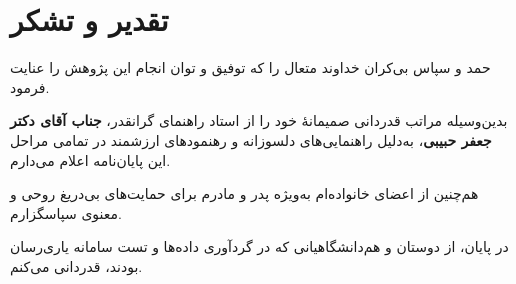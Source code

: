 
\section*{تقدیر و تشکر}

حمد و سپاس بی‌کران خداوند متعال را که توفیق و توان انجام این پژوهش را عنایت فرمود.

بدین‌وسیله مراتب قدردانی صمیمانه‌ٔ خود را از استاد راهنمای گرانقدر، \textbf{جناب آقای دکتر جعفر حبیبی}، به‌دلیل راهنمایی‌های دلسوزانه و رهنمودهای ارزشمند در تمامی مراحل این پایان‌نامه اعلام می‌دارم.

هم‌چنین از اعضای خانواده‌ام به‌ویژه پدر و مادرم برای حمایت‌های بی‌دریغ روحی و معنوی سپاسگزارم.

در پایان، از دوستان و هم‌دانشگاهیانی که در گردآوری داده‌ها و تست سامانه یاری‌رسان بودند، قدردانی می‌کنم.

\pagebreak
